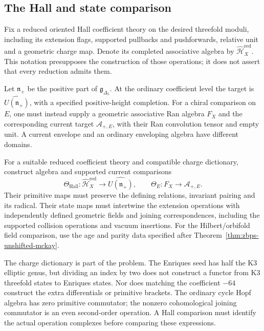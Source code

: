 \subsection{The Hall and state comparison}
\label{sec:hall-borcherds-residual}

Fix a reduced oriented Hall coefficient theory on the desired
threefold moduli, including its extension flags, supported
pullbacks and pushforwards, relative unit and a geometric charge
map.  Denote its completed associative algebra by
\(\widehat{\mathcal H}^{\mathrm{red}}_X\).  This notation
presupposes the construction of those operations; it does not
assert that every reduction admits them.

Let \(\mathfrak n_+\) be the positive part of
\(\mathfrak g_{\Delta_5}\).  At the ordinary coefficient level
the target is \(\widehat{U(\mathfrak n_+)}\), with a specified
positive-height completion.  For a chiral comparison on \(E\),
one must instead supply a geometric associative Ran algebra
\(F_X\) and the corresponding current target
\(\mathcal A_{+,E}\), with their Ran convolution tensor and
empty unit.  A current envelope and an ordinary enveloping
algebra have different domains.

\begin{conjecture}
\label{conj:zbps-hall-borcherds-residual}
For a suitable reduced coefficient theory and compatible charge
dictionary, construct algebra and supported current comparisons
\begin{equation}\label{eq:zbps-hall-to-borch}
 \Theta_{\mathrm{Hall}}:
 \widehat{\mathcal H}^{\mathrm{red}}_X
 \longrightarrow\widehat{U(\mathfrak n_+)},
 \qquad
 \Theta_E:F_X\longrightarrow\mathcal A_{+,E}.
\end{equation}
Their primitive maps must preserve the defining relations,
invariant pairing and its radical.  Their state maps must
intertwine the extension operations with independently defined
geometric fields and joining correspondences, including the
supported collision operations and vacuum insertions.  For the
Hilbert/orbifold field comparison, use the age and parity data
specified after Theorem~\ref{thm:zbps-unshifted-mckay}.
\end{conjecture}

The charge dictionary is part of the problem.  The Enriques
seed has half the K3 elliptic genus, but dividing an index by two
does not construct a functor from K3 threefold states to Enriques
states.  Nor does matching the coefficient \(-64\) construct
the extra differentials or primitive brackets.  The ordinary
cycle Hopf algebra has zero primitive commutator; the nonzero
cohomological joining commutator is an even second-order
operation.  A Hall comparison must identify the actual operation
complexes before comparing these expressions.

